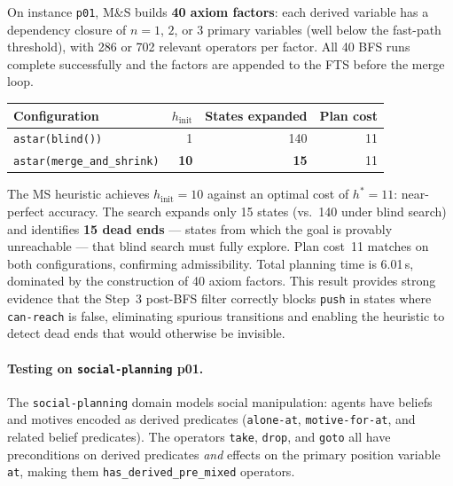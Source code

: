 \documentclass[11pt,a4paper]{article}
\begin{document}
\begin{itemize}
    On instance \texttt{p01}, M\&S builds \textbf{40 axiom factors}: each
    derived variable has a dependency closure of $n = 1$, $2$, or $3$
    primary variables (well below the fast-path threshold), with 286
    or 702 relevant operators per factor.  All 40 BFS runs complete
    successfully and the factors are appended to the FTS before the
    merge loop.

    \begin{center}
    \begin{tabular}{lrrr}
    \toprule
    \textbf{Configuration} & \textbf{$h_{\mathrm{init}}$}
      & \textbf{States expanded} & \textbf{Plan cost} \\
    \midrule
    \texttt{astar(blind())}            & 1  & 140 & 11 \\
    \texttt{astar(merge\_and\_shrink)} & \textbf{10} & \textbf{15}  & 11 \\
    \bottomrule
    \end{tabular}
    \end{center}

    The MS heuristic achieves $h_{\mathrm{init}} = 10$ against an optimal
    cost of $h^* = 11$: near-perfect accuracy.  The search expands only
    15 states (vs.\ 140 under blind search) and identifies \textbf{15 dead
    ends} — states from which the goal is provably unreachable — that blind
    search must fully explore.  Plan cost~11 matches on both configurations,
    confirming admissibility.  Total planning time is 6.01\,s, dominated by
    the construction of 40 axiom factors.  This result provides strong
    evidence that the Step~3 post-BFS filter correctly blocks \texttt{push}
    in states where \texttt{can-reach} is false, eliminating spurious
    transitions and enabling the heuristic to detect dead ends that would
    otherwise be invisible.

    \paragraph{Testing on \texttt{social-planning} p01.}

    The \texttt{social-planning} domain models social manipulation: agents
    have beliefs and motives encoded as derived predicates
    (\texttt{alone-at}, \texttt{motive-for-at}, and related belief
    predicates).  The operators \texttt{take}, \texttt{drop}, and
    \texttt{goto} all have preconditions on derived predicates \emph{and}
    effects on the primary position variable \texttt{at}, making them
    \texttt{has\_derived\_pre\_mixed} operators.


\end{itemize}
\end{document}
